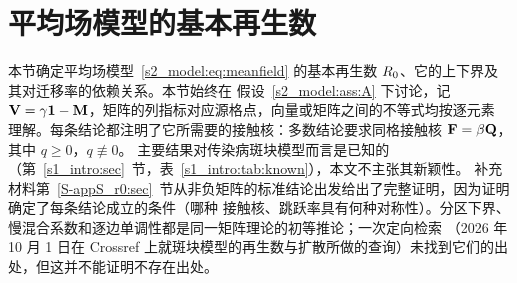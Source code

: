 \section{平均场模型的基本再生数}\label{s3_r0:sec}

本节确定平均场模型~\eqref{s2_model:eq:meanfield} 的基本再生数 $R_0$、它的上下界及其对迁移率的依赖关系。本节始终在
假设~\ref{s2_model:ass:A} 下讨论，记 $\mathbf{V}=\gamma\mathbf{1}-\mathbf{M}$，矩阵的列指标对应源格点，向量或矩阵之间的不等式均按逐元素
理解。每条结论都注明了它所需要的接触核：多数结论要求同格接触核 $\mathbf{F}=\beta\mathbf{Q}$，其中 $q\ge0$，$q\not\equiv0$。
主要结果对传染病斑块模型而言是已知的（第~\ref{s1_intro:sec}~节，表~\ref{s1_intro:tab:known}），本文不主张其新颖性。
补充材料第~\ref{S-appS_r0:sec}~节从非负矩阵的标准结论出发给出了完整证明，因为证明确定了每条结论成立的条件（哪种
接触核、跳跃率具有何种对称性）。分区下界、慢混合系数和逐边单调性都是同一矩阵理论的初等推论；一次定向检索
（2026 年 10 月 1 日在 Crossref 上就斑块模型的再生数与扩散所做的查询）未找到它们的出处，但这并不能证明不存在出处。

